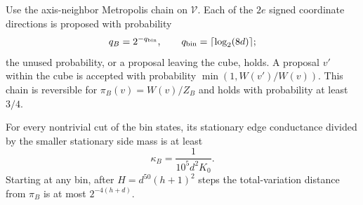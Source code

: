 Use the axis-neighbor Metropolis chain on $\mathcal V$.  Each of the
$2e$ signed coordinate directions is proposed with probability
\[
 q_B=2^{-q_{\rm bin}},\qquad
 q_{\rm bin}=\lceil\log_2(8d)\rceil;
\]
the unused probability, or a proposal leaving the cube, holds.  A
proposal $v'$ within the cube is accepted with probability
$\min(1,W(v')/W(v))$.  This chain is reversible for
$\pi_B(v)=W(v)/Z_B$ and holds with probability at least $3/4$.

\begin{proposition}\label{prop:bin-gap}
For every nontrivial cut of the bin states, its stationary edge
conductance divided by the smaller stationary side mass is at least
\[
 \kappa_B=\frac1{10^5d^2K_0}.
\]
Starting at any bin, after
$H=d^{50}(h+1)^2$ steps the total-variation distance from $\pi_B$ is at
most $2^{-4(h+d)}$.
\end{proposition}
